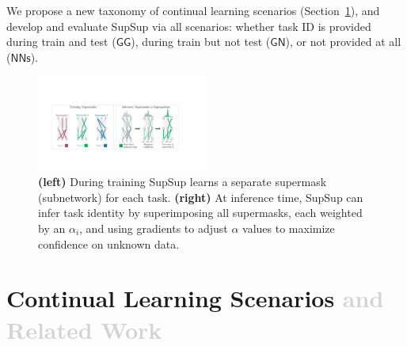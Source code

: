 \documentclass{article}
\newcommand{\ac}{SupSup\xspace}
\newcommand{\comments}[1]{#1}
\newcommand{\comments}[1]{}
\newcommand{\removed}[1]{\comments{\textcolor{lightgray}{#1}}}
\newcommand{\casename}[1]{\ensuremath{\mathsf{#1}}\xspace}
\newcommand{\figlabel}[1]{\label{fig:#1}}
\newcommand{\secref}[1]{Section~\ref{sec:#1}}
\begin{document}
We propose a new taxonomy of continual learning scenarios (\secref{cl}), and develop and evaluate \ac via all scenarios: whether task ID is provided during train and test (\casename{GG}), during train but not test (\casename{GN}), or not provided at all (\casename{NNs}). 
\begin{figure}[t]
    \centering
    \includegraphics[width=0.5\textwidth]{figs/teaser_ppt.pdf}
    \caption{\textbf{(left)} During training \ac learns a separate supermask (subnetwork) for each task. \textbf{(right)} At inference time, \ac can infer task identity by superimposing all supermasks, each weighted by an $\alpha_i$, and using gradients to adjust $\alpha$ values to maximize confidence on unknown data.}
    \vspace*{-1em}
    \figlabel{teaser}
\end{figure}

\vspace*{-1ex}
\section{Continual Learning Scenarios \removed{and Related Work}}
\label{sec:cl}
\end{document}
